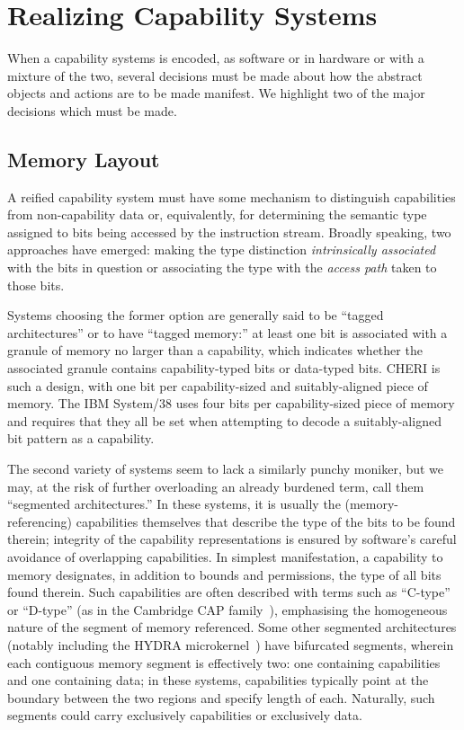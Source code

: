 \section{Realizing Capability Systems} %

When a capability systems is encoded, as software or in hardware or with a
mixture of the two, several decisions must be made about how the abstract
objects and actions are to be made manifest.  We highlight two of the major
decisions which must be made.

\subsection{Memory Layout} %

A reified capability system must have some mechanism to distinguish
capabilities from non-capability data or, equivalently, for determining the
semantic type assigned to bits being accessed by the instruction stream.
Broadly speaking, two approaches have emerged: making the type distinction
\emph{intrinsically associated} with the bits in question or associating the
type with the \emph{access path} taken to those bits.

Systems choosing the former option are generally said to be ``tagged
architectures'' or to have ``tagged memory:'' at least one bit is associated
with a granule of memory no larger than a capability, which indicates
whether the associated granule contains capability-typed bits or data-typed
bits.  CHERI is such a design, with one bit per capability-sized and
suitably-aligned piece of memory.  The IBM System/38 uses four bits per
capability-sized piece of memory and requires that they all be set when
attempting to decode a suitably-aligned bit pattern as a capability.

The second variety of systems seem to lack a similarly punchy moniker, but we
may, at the risk of further overloading an already burdened term, call them
``segmented architectures.''  In these systems, it is usually the
(memory-referencing) capabilities themselves that describe the type of the bits
to be found therein; integrity of the capability representations is ensured by
software's careful avoidance of overlapping capabilities.  In simplest
manifestation, a capability to memory designates, in addition to bounds and
permissions, the type of all bits found therein.  Such capabilities are often
described with terms such as ``C-type'' or ``D-type'' (as in the Cambridge CAP
family~\cite{WilkesNeedham79}), emphasising the homogeneous nature of the
segment of memory referenced.  Some other segmented architectures (notably
including the HYDRA microkernel~\cite{CohenJefferson75,Wulf81}) have bifurcated
segments, wherein each contiguous memory segment is effectively two: one
containing capabilities and one containing data; in these systems, capabilities
typically point at the boundary between the two regions and specify length of
each.  Naturally, such segments could carry exclusively capabilities or
exclusively data.

